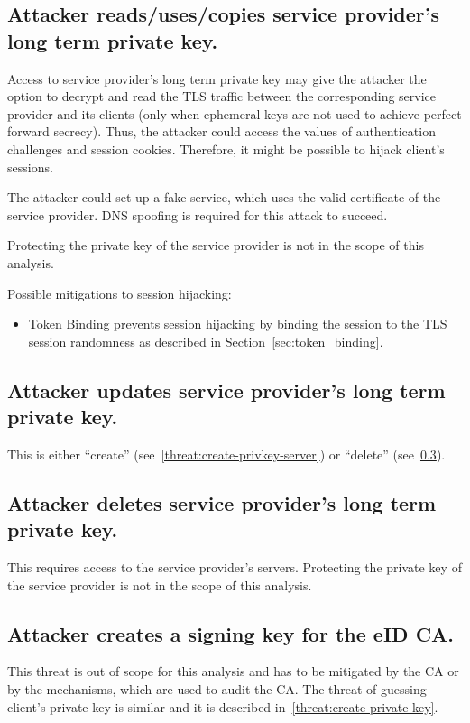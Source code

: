 \subsection{Attacker reads/uses/copies service provider's long term private key.}
\label{threat:read-privkey-server}
Access to service provider's long term private key may give the attacker the option to decrypt and read the TLS traffic between the corresponding service provider and its clients (only when ephemeral keys are not used to achieve perfect forward secrecy). Thus, the attacker could access the values of authentication challenges and session cookies. Therefore, it might be possible to hijack client's sessions.

The attacker could set up a fake service, which uses the valid certificate of the service provider. DNS spoofing is required for this attack to succeed.

Protecting the private key of the service provider is not in the scope of this analysis.

Possible mitigations to session hijacking:
\begin{itemize}
\item Token Binding prevents session hijacking by binding the session to the TLS session randomness as described in Section~\ref{sec:token_binding}.
\end{itemize}


\subsection{Attacker updates service provider's long term private key.}
\label{threat:update-privkey-server}
This is either ``create'' (see~\ref{threat:create-privkey-server}) or ``delete'' (see~\ref{threat:delete-privkey-server}).


\subsection{Attacker deletes service provider's long term private key.}
\label{threat:delete-privkey-server}
This requires access to the service provider's servers. Protecting the private key of the service provider is not in the scope of this analysis.





\subsection{Attacker creates a signing key for the eID CA.}
\label{threat:new-ca-key}
This threat is out of scope for this analysis and has to be mitigated by the CA or by the mechanisms, which are used to audit the CA. The threat of guessing client's private key is similar and it is described in~\ref{threat:create-private-key}.


